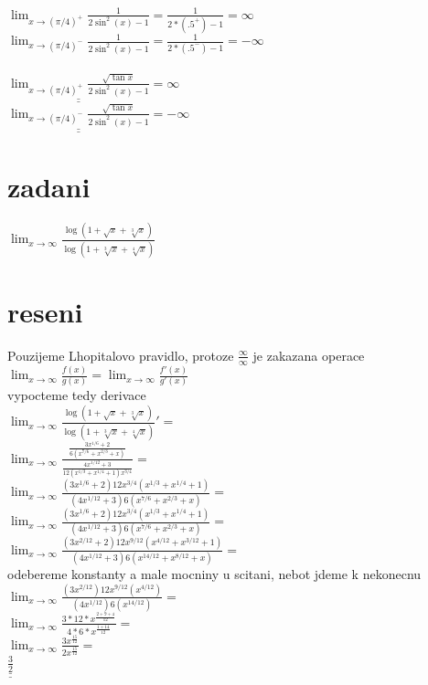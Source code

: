 \documentclass[a4paper]{article}
\def\doubleunderline#1{\underline{\underline{#1}}}
\begin{document}
$\lim_{x \rightarrow (\pi / 4)^+} \frac{1}{2 \sin^2 (x) - 1} = \frac{1}{2*(.5^+)-1} = \infty$\\
$\lim_{x \rightarrow (\pi / 4)^-} \frac{1}{2 \sin^2 (x) - 1} = \frac{1}{2*(.5^-)-1} = -\infty$\\
\\
$\doubleunderline{\lim_{x \rightarrow (\pi / 4)^+} \frac{\sqrt{\tan x}}{2 \sin^2 (x) -1}} = \infty$\\
$\doubleunderline{\lim_{x \rightarrow (\pi / 4)^-} \frac{\sqrt{\tan x}}{2 \sin^2 (x) -1}} = -\infty$






\section*{zadani}
$\lim_{x \rightarrow \infty} \frac{\log(1+\sqrt{x}+\sqrt[3]{x})}{\log(1+\sqrt[3]{x}+\sqrt[4]{x})}$

\section*{reseni}
Pouzijeme Lhopitalovo pravidlo, protoze $\frac{\infty}{\infty}$ je zakazana operace\\
$
\lim_{x \rightarrow \infty} \frac{f(x)}{g(x)} = 
\lim_{x \rightarrow \infty} \frac{f'(x)}{g'(x)}
$\\
vypocteme tedy derivace\\
$
\lim_{x \rightarrow \infty} \frac{
	\log(1+\sqrt{x}+\sqrt[3]{x})
}{
	\log(1+\sqrt[3]{x}+\sqrt[4]{x})
}' =
$\\
$
\lim_{x \rightarrow \infty} \frac{
	\frac{
		3x^{1/6} + 2
	}{
		6(x^{7/6} + x^{2/3} + x)
	}
}{
	\frac{
		4 x^{1/12} + 3
	}{
		12 (x^{1/3} + x^{1/4} + 1) x^{3/4}
	}
} =
$\\
$
\lim_{x \rightarrow \infty} \frac{
	(3x^{1/6}+2)12x^{3/4}(x^{1/3}+x^{1/4}+1)
}{
	(4x^{1/12}+3)6(x^{7/6}+x^{2/3}+x)	
} =
$\\
$
\lim_{x \rightarrow \infty} \frac{
	(3x^{1/6}+2)12x^{3/4}(x^{1/3}+x^{1/4}+1)
}{
	(4x^{1/12}+3)6(x^{7/6}+x^{2/3}+x)	
} =
$\\
$
\lim_{x \rightarrow \infty} \frac{
	(3x^{2/12}+2)12x^{9/12}(x^{4/12}+x^{3/12}+1)
}{
	(4x^{1/12}+3)6(x^{14/12}+x^{8/12}+x)	
} =
$\\
odebereme konstanty a male mocniny u scitani, nebot jdeme k nekonecnu\\
$
\lim_{x \rightarrow \infty} \frac{
	(3x^{2/12})  12x^{9/12}   (x^{4/12})
}{
	(4x^{1/12}) 6 (x^{14/12})	
} =
$\\
$
\lim_{x \rightarrow \infty} \frac{
	3*12*x^\frac{2+9+4}{12}
}{
	4*6*x^\frac{1+14}{12}	
} =
$\\
$
\lim_{x \rightarrow \infty} \frac{
	3x^\frac{15}{12}
}{
	2x^\frac{15}{12}	
} =
$\\
$
\doubleunderline{\frac{3}{2}}
$\\
\end{document}
